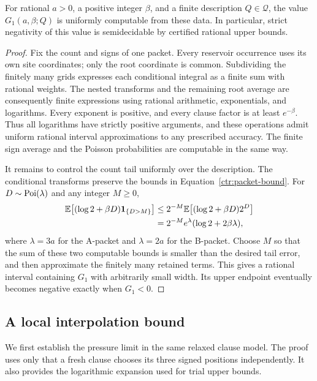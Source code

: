 \begin{lemma}
\label{ctr:evaluation}
For rational $a>0$, a positive integer $\beta$, and a finite description
$Q\in\mathcal Q$, the value $G_1(a,\beta;Q)$ is uniformly computable from
these data.  In particular, strict negativity of this value is semidecidable
by certified rational upper bounds.
\end{lemma}

\begin{proof}
Fix the count and signs of one packet.  Every reservoir occurrence uses
its own site coordinates; only the root coordinate is common.  Subdividing
the finitely many grids expresses each conditional integral as a finite sum
with rational weights.  The nested transforms and the remaining root average
are consequently finite expressions using rational arithmetic, exponentials,
and logarithms.  Every exponent is positive, and every clause factor is at
least $e^{-\beta}$.  Thus all logarithms have strictly positive arguments,
and these operations admit uniform rational interval approximations to any
prescribed accuracy.  The finite sign average and the Poisson probabilities
are computable in the same way.

It remains to control the count tail uniformly over the description.  The
conditional transforms preserve the bounds in
Equation~\eqref{ctr:packet-bound}.  For $D\sim\operatorname{Poi}(\lambda)$ and any integer
$M\ge0$,
\begin{align}
 \mathbb E\bigl[(\log2+\beta D)\mathbf 1_{\{D>M\}}\bigr]
 &\le 2^{-M}\mathbb E\bigl[(\log2+\beta D)2^D\bigr] \notag\\
 &=2^{-M}e^{\lambda}(\log2+2\beta\lambda),
 \label{ctr:poisson-tail}
\end{align}
where $\lambda=3a$ for the A-packet and $\lambda=2a$ for the B-packet.
Choose $M$ so that the sum of these two computable bounds is smaller than
the desired tail error, and then approximate the finitely many retained terms.
This gives a rational interval containing $G_1$ with arbitrarily small width.
Its upper endpoint eventually becomes negative exactly when $G_1<0$.
\end{proof}

\subsection{A local interpolation bound}

We first establish the pressure limit in the same relaxed clause model.
The proof uses only that a fresh clause chooses its three signed positions
independently.  It also provides the logarithmic expansion used for trial
upper bounds.

